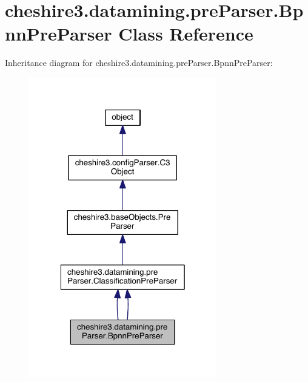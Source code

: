 \hypertarget{classcheshire3_1_1datamining_1_1pre_parser_1_1_bpnn_pre_parser}{\section{cheshire3.\-datamining.\-pre\-Parser.\-Bpnn\-Pre\-Parser Class Reference}
\label{classcheshire3_1_1datamining_1_1pre_parser_1_1_bpnn_pre_parser}
}


Inheritance diagram for cheshire3.\-datamining.\-pre\-Parser.\-Bpnn\-Pre\-Parser\-:
\nopagebreak
\begin{figure}[H]
\begin{center}
\leavevmode
\includegraphics[width=232pt]{classcheshire3_1_1datamining_1_1pre_parser_1_1_bpnn_pre_parser__inherit__graph}
\end{center}
\end{figure}


